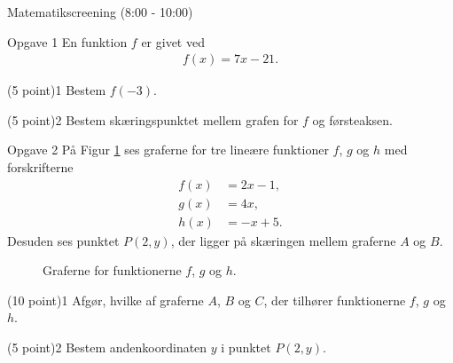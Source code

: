 
\begin{center}
\LARGE
Matematikscreening (8:00 - 10:00)
\end{center}

\begin{opgavetekst}{Opgave 1}
En funktion $f$ er givet ved 
\begin{align*}
f(x) = 7x - 21.
\end{align*}
\end{opgavetekst}
\begin{delopgave}{(5 point)}{1}
		Bestem $f(-3)$.
\end{delopgave}
\begin{delopgave}{(5 point)}{2}
	Bestem skæringspunktet mellem grafen for $f$ og førsteaksen.
\end{delopgave}
\begin{opgavetekst}{Opgave 2}
	På Figur \ref{fig:lines} ses graferne for tre lineære funktioner $f$, $g$ og $h$ 
	med forskrifterne 
	\begin{align*}
		f(x) &= 2x-1,\\
		g(x) &= 4x,\\
		h(x) &= -x+5.
	\end{align*}
	Desuden ses punktet $P(2,y)$, der ligger på skæringen mellem graferne $A$ og $B$.
	\begin{figure}[H]
		\centering
		\caption{Graferne for funktionerne $f$, $g$ og $h$.}
		\label{fig:lines}
	\end{figure}\phantom{h}
\end{opgavetekst}
\begin{delopgave}{(10 point)}{1}
	Afgør, hvilke af graferne $A$, $B$ og $C$, der tilhører funktionerne $f$, $g$ og $h$. 
\end{delopgave}
\begin{delopgave}{(5 point)}{2}
	Bestem andenkoordinaten $y$ i punktet $P(2,y)$.
\end{delopgave}

